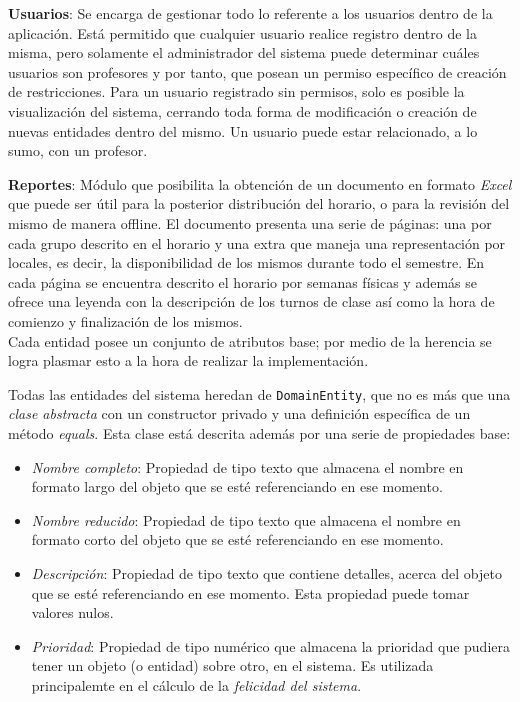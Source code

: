 \textbf{Usuarios}: Se encarga de gestionar todo lo referente a los usuarios dentro de la aplicación. Está permitido que cualquier usuario realice registro dentro de la misma, pero solamente el administrador del sistema puede determinar cuáles usuarios son profesores y por tanto, que posean un permiso específico de creación de restricciones. Para un usuario registrado sin permisos, solo es posible la visualización del sistema, cerrando toda forma de modificación o creación de nuevas entidades dentro del mismo. Un usuario puede estar relacionado, a lo sumo, con un profesor. 

\textbf{Reportes}: Módulo que posibilita la obtención de un documento en formato \textit{Excel} que puede ser útil para la posterior distribución del horario, o para la revisión del mismo de manera offline. El documento presenta una serie de páginas: una por cada grupo descrito en el horario y una extra que maneja una representación por locales, es decir, la disponibilidad de los mismos durante todo el semestre. En cada página se encuentra descrito el horario por semanas físicas y además se ofrece una leyenda con la descripción de los turnos de clase así como la hora de comienzo y finalización de los mismos.\\

Cada entidad posee un conjunto de atributos base; por medio de la herencia se logra plasmar esto a la hora de realizar la implementación. 

Todas las entidades del sistema heredan de \texttt{DomainEntity}, que no es más que una \textit{clase abstracta} con un constructor privado y una definición específica de un método \textit{equals}. Esta clase está descrita además por una serie de propiedades base:

\label{props:base}
\begin{itemize}
	\item \textsl{Nombre completo}: Propiedad de tipo texto que almacena el nombre en formato largo del objeto que se esté referenciando en ese momento. 
	\item \textsl{Nombre reducido}: Propiedad de tipo texto que almacena el nombre en formato corto del objeto que se esté referenciando en ese momento. 
	\item \textsl{Descripción}: Propiedad de tipo texto que contiene detalles, acerca del objeto que se esté referenciando en ese momento. Esta propiedad puede tomar valores nulos.
	\item \textsl{Prioridad}: Propiedad de tipo numérico que almacena la prioridad que pudiera tener un objeto (o entidad) sobre otro, en el sistema. Es utilizada principalemte en el cálculo de la \textit{felicidad del sistema}.

\end{itemize}



